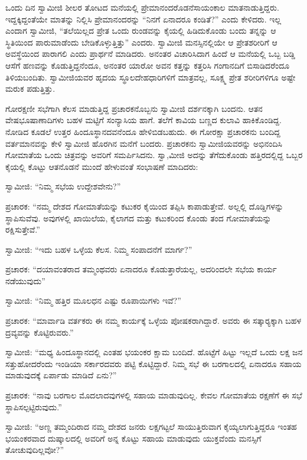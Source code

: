  ಒಂದು ದಿನ ಸ್ವಾಮೀಜಿ ಶೀಲರ ತೋಟದ ಮನೆಯಲ್ಲಿ ಪ್ರೇಮಾನಂದರೊಡನೆ\break ಸಾಯಂಕಾಲ ಮಾತನಾಡುತ್ತಿದ್ದರು. ಇದ್ದಕ್ಕಿದ್ದಂತೆಯೇ ಮಾತನ್ನು ನಿಲ್ಲಿಸಿ ಪ್ರೇಮಾನಂದರನ್ನು “ನಿನಗೆ ಏನಾದರೂ ಕಂಡಿತೆ?” ಎಂದು ಕೇಳಿದರು. ಇಲ್ಲ ಎಂದಾಗ ಸ್ವಾಮೀಜಿ, “ತಲೆಯಿಲ್ಲದ ಪ್ರೇತ ಒಂದು ರುಂಡವನ್ನು ಕೈಯಲ್ಲಿ ಹಿಡಿದುಕೊಂಡು ಬಂದು ತನ್ನನ್ನು ಆ ಸ್ಥಿತಿಯಿಂದ ಪಾರುಮಾಡೆಂದು ಬೇಡಿಕೊಳ್ಳುತ್ತಿತ್ತು” ಎಂದರು. ಸ್ವಾಮೀಜಿ ಮನಸ್ಸಿನಲ್ಲಿಯೇ ಆ ಪ್ರೇತಶರೀರಿಗೆ ಆ ಅವಸ್ಥೆಯಿಂದ ಪಾರಾಗಲಿ ಎಂದು ಪ್ರಾರ್ಥನೆ ಮಾಡಿದರು. ಅನಂತರ ವಿಚಾರಿಸಿದಾಗ ಹಿಂದೆ ಆ ಮನೆಯಲ್ಲಿ ಒಬ್ಬ ಬಡ್ಡಿ ಆಸೆಗೆ ಹಣವನ್ನು ಕೊಡುತ್ತಿದ್ದನೆಂದೂ, ಅನಂತರ ಯಾರೋ ಅವನ ಕತ್ತನ್ನು ಕತ್ತರಿಸಿ ಗಂಗಾನದಿಗೆ ಬಿಸಾಡಿದರೆಂದೂ ತಿಳಿಯಬಂದಿತು. ಸ್ವಾಮೀಜಿಯವರ ಹೃದಯ ಸ್ಥೂಲದೇಹಧಾರಿಗಳಿಗೆ ಮಾತ್ರವಲ್ಲ, ಸೂಕ್ಷ್ಮ ಪ್ರೇತ ಶರೀರಿಗಳಿಗೂ ಅಷ್ಟೇ ಮರುಕ ಪಡುತ್ತಿತ್ತು. 

 ಗೋರಕ್ಷಣೀ ಸಭೆಗಾಗಿ ಕೆಲಸ ಮಾಡುತ್ತಿದ್ದ ಪ್ರಚಾರಕನೊಬ್ಬನು ಸ್ವಾಮೀಜಿ ದರ್ಶನಕ್ಕಾಗಿ ಬಂದನು. ಆತನ ವೇಷಭೂಷಾಣಾದಿಗಳು ಬಹಳ ಮಟ್ಟಿಗೆ ಸಂನ್ಯಾಸಿಯ ಹಾಗೆ. ತಲೆಗೆ ಕಾವಿಯ ಬಣ್ಣದ ಕುಲಾವಿ ಹಾಕಿಕೊಂಡಿದ್ದ. ನೋಡಿದ ಕೂಡಲೆ ಉತ್ತರ ಹಿಂದೂಸ್ಥಾನದವನೆಂದೂ ಹೇಳಿಬಿಡಬಹುದು. ಈ ಗೋರಕ್ಷಾ ಪ್ರಚಾರಕನು ಬಂದಿದ್ದ ವರ್ತಮಾನವನ್ನು ಕೇಳಿ ಸ್ವಾಮೀಜಿ ಹೊರಗಿನ ಮನೆಗೆ ಬಂದರು. ಪ್ರಚಾರಕನು ಸ್ವಾಮೀಜಿಯವರನ್ನು ಅಭಿನಂದಿಸಿ ಗೋಮಾತೆಯ ಒಂದು ಚಿತ್ರವನ್ನು ಅವರಿಗೆ ಸಮರ್ಪಿಸಿದನು. ಸ್ವಾ,ಮೀಜಿ ಅದನ್ನು ತೆಗೆದುಕೊಂಡು ಹತ್ತಿರದಲ್ಲಿದ್ದ ಒಬ್ಬರ ಕೈಯಲ್ಲಿ ಕೊಟ್ಟು ಆತನೊಡನೆ ಮುಂದೆ ಹೇಳುವಂತೆ ಸಂಭಾಷಣೆ ಮಾದಿದರು: 

 ಸ್ವಾಮೀಜಿ: “ನಿಮ್ಮ ಸಭೆಯ ಉದ್ದೇಶವೇನು?” 

 ಪ್ರಚಾರಕ: “ನಮ್ಮ ದೇಶದ ಗೋಮಾತೆಯನ್ನು ಕಟುಕರ ಕೈಯಿಂದ ತಪ್ಪಿಸಿ ಕಾಪಾಡುತ್ತೇವೆ. ಅಲ್ಲಲ್ಲಿ ದೊಡ್ಡಿಗಳನ್ನು ಸ್ಥಾಪಿಸುವೆವು. ಅವುಗಳಲ್ಲಿ ಖಾಯಿಲೆಯ, ಕೈಲಾಗದ ಮತ್ತು ಕಟುಕರಿಂದ ಕೊಂಡು ತಂದ ಗೋಮಾತೆಯನ್ನು ರಕ್ಷಿಸುತ್ತೇವೆ.” 

 ಸ್ವಾಮೀಜಿ: “ಇದು ಬಹಳ ಒಳ್ಳೆಯ ಕೆಲಸ. ನಿಮ್ಮ ಸಂಪಾದನೆಗೆ ಮಾರ್ಗ?” 

 ಪ್ರಚಾರಕ: “ದಯಾವಂತರಾದ ತಮ್ಮಂಥವರು ಏನಾದರೂ ಕೊಡುತ್ತಾರೆಯಲ್ಲ, ಅದರಿಂದಲೇ ಸಭೆಯ ಕಾರ್ಯ ನಡೆಯುವುದು” 

 ಸ್ವಾಮೀಜಿ: “ನಿಮ್ಮ ಹತ್ತಿರ ಮೂಲಧನ ಎಷ್ಟು ರೂಪಾಯಿಗಳು ಇವೆ?” 

 ಪ್ರಚಾರಕ: “ಮಾರ್ವಾಡಿ ವರ್ತಕರು ಈ ನಮ್ಮ ಕಾರ್ಯಕ್ಕೆ ಒಳ್ಳೆಯ ಪೋಷಕರಾಗಿದ್ದಾರೆ. ಅವರು ಈ ಸತ್ಕಾರ‍್ಯಕ್ಕಾಗಿ ಬಹಳ ದ್ರವ್ಯವನ್ನು ಕೊಟ್ಟಿರುವರು.” 

 ಸ್ವಾಮೀಜಿ: “ಮಧ್ಯ ಹಿಂದೂಸ್ಥಾನದಲ್ಲಿ ಎಂತಹ ಭಯಂಕರ ಕ್ಷಾಮ ಬಂದಿದೆ. ಹೊಟ್ಟೆಗೆ ಹಿಟ್ಟು ಇಲ್ಲದೆ ಒಂದು ಲಕ್ಷ ಜನ ಸತ್ತುಹೋದರೆಂದು ಇಂಡಿಯಾ ಸರ್ಕಾರದವರು ಪಟ್ಟಿ ಕೊಟ್ಟಿದ್ದಾರೆ. ನಿಮ್ಮ ಸಭೆ ಈ ಬರಗಾಲದಲ್ಲಿ ಏನಾದರೂ ಸಹಾಯ ಮಾಡುವುದಕ್ಕೆ ಏರ್ಪಾಡು ಮಾಡಿದೆ ಏನು?” 

 ಪ್ರಚಾರಕ: “ನಾವು ಬರಗಾಲ ಮೊದಲಾದವುಗಳಲ್ಲಿ ಸಹಾಯ ಮಾಡುವುದಿಲ್ಲ. ಕೇವಲ ಗೋಮಾತೆಯ ರಕ್ಷಣೆಗೆ ಈ ಸಭೆ ಸ್ಥಾಪಿಸಲ್ಪಟ್ಟಿರುವುದು.” 

 ಸ್ವಾಮೀಜಿ: “ಅಣ್ಣ ತಮ್ಮಂದಿರಾದ ನಮ್ಮ ದೇಶದ ಜನರು ಲಕ್ಷಗಟ್ಟಲೆ ಸಾಯುತ್ತಿರುವಾಗ ಕೈಯ್ಯಲಾಗುತ್ತಿದ್ದರೂ ಇಂತಹ ಭಯಂಕರವಾದ ದುಷ್ಕಾಲದಲ್ಲಿ ಅವರಿಗೆ ಅನ್ನ ಕೊಟ್ಟು ಸಹಾಯ ಮಾಡುವುದು ಯುಕ್ತವೆಂದು ಮನಸ್ಸಿಗೆ ತೋಚುವುದಿಲ್ಲವೋ?” 


